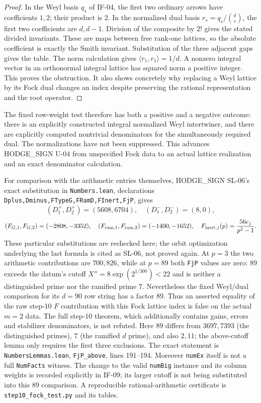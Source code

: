 \begin{proof}
In the Weyl basis $q_s$ of IF-04, the first two ordinary arrows have
coefficients $1,2$; their product is $2$. In the normalized dual basis
$r_s=q_s/\binom ds$, the first two coefficients are $d,d-1$. Division
of the composite by $2!$ gives the stated divided invariants. These are
maps between free rank-one lattices, so the absolute coefficient is
exactly the Smith invariant. Substitution of the three adjacent gaps
gives the table. The norm calculation gives
$\langle r_1,r_1\rangle=1/d$. A nonzero integral vector in an
orthonormal integral lattice has squared norm a positive integer. This
proves the obstruction. It also shows concretely why replacing a Weyl
lattice by its Fock dual changes an index despite preserving the
rational representation and the root operator.
\end{proof}

The fixed row-weight test therefore has both a positive and a negative
outcome: there is an explicitly constructed integral normalized Weyl
intertwiner, and there are explicitly computed nontrivial denominators
for the simultaneously required dual. The normalizations have not been
suppressed. This advances HODGE\_SIGN U-04 from unspecified Fock data to
an actual lattice realization and an exact denominator calculation.

For comparison with the arithmetic entries themselves, HODGE\_SIGN
SL-06's exact substitution in \texttt{Numbers.lean}, declarations
\texttt{Dplus,Dminus,FTypeG,FRamD,FInert,FjP}, gives
\[
 (D_1^+,D_2^+)=(5608,6704),\quad(D_1^-,D_2^-)=(8,0),
\]
\[
 (F_{G,1},F_{G,2})=(-2808,-3352),\quad
 (F_{{\rm ram},1},F_{{\rm ram},2})=(-1400,-1652),\quad
 F_{{\rm inert},j}(p)=\frac{56e_j}{p^2-1}.
\]
These particular substitutions are rechecked here; the orbit optimization
underlying the last formula is cited as SL-06, not proved again.
At $p=3$ the two arithmetic contributions are $700,826$, while at
$p=89$ both \texttt{FjP} values are zero: $89$ exceeds the datum's cutoff
$X''=8\exp(2^{1/300})<22$ and is neither a distinguished prime nor the
ramified prime $7$. Nevertheless the fixed Weyl/dual comparison for its
$d=90$ row string has a factor $89$. Thus an asserted equality of the
raw step-10 $F$ contribution with this Fock lattice index is false on
the actual $m=2$ data. The full step-10 theorem, which additionally
contains gains, errors and stabilizer denominators, is not refuted.
Here $89$ differs from $3697,7393$ (the distinguished primes),
$7$ (the ramified $d$ prime), and also $2,11$; the above-cutoff
lemma only requires the first three exclusions. The exact statement is
\texttt{NumbersLemmas.lean}, \texttt{FjP\_above}, lines 191--194.
Moreover \texttt{numEx} itself is not a full \texttt{NumFacts}
witness. The change to the valid \texttt{numBig} instance and its
column weights is recorded explicitly in IF-09; its larger cutoff
is not being substituted into this $89$ comparison.
A reproducible rational-arithmetic certificate is
\texttt{step10\_fock\_test.py} and its tables.

